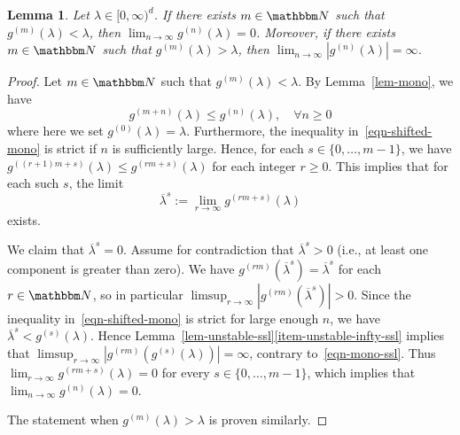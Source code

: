 \documentclass[11pt]{article}
\theoremstyle{plain}
\newtheorem{lem}[thm]{Lemma}
\theoremstyle{definition}
\numberwithin{equation}{section}
\newcommand{\eqb}{\begin{equation}}
\newcommand{\eqe}{\end{equation}}
\newcommand{\BB}{\mathbbm}
\newcommand{\ol}{\overline}
\begin{document}
\begin{lem} \label{lem-monotone-lim}
Let $\lambda \in [0,\infty)^d$.
If there exists $ m \in \BB N$ such that $g^{(m)}(\lambda) < \lambda$, then $\lim_{n\to\infty} g^{(n)}(\lambda) = 0$. 
Moreover, if there exists $m \in\BB N$ such that $g^{(m)}(\lambda) > \lambda$, then $\lim_{n\to\infty} |g^{(n)}(\lambda)| = \infty$.
\end{lem}
\begin{proof}
Let $m \in \BB N$ such that $g^{(m)}(\lambda) < \lambda$. 
By Lemma~\ref{lem-mono}, we have
\eqb  \label{eqn-shifted-mono} 
g^{(m + n)}(\lambda) \leq g^{(n)}(\lambda) ,\quad \forall n \geq 0 
\eqe 
where here we set $g^{(0)}(\lambda) = \lambda$. Furthermore, the inequality in~\eqref{eqn-shifted-mono} is strict if $n$ is sufficiently large. 
Hence, for each $s \in \{0,\dots,m-1\}$, we have $g^{((r+1) m + s)}(\lambda) \leq g^{(r m +s)}(\lambda)$ for each integer $r  \geq 0$. This implies that for each such $s$, the limit
\eqb  \label{eqn-mono-ssl}
\ol\lambda^s := \lim_{r \to \infty} g^{(r m + s)}(\lambda) 
\eqe 
exists. 

We claim that $\ol\lambda^s = 0$.  
Assume for contradiction that $\ol\lambda^s  > 0$ (i.e., at least one component is greater than zero). 
We have $g^{(r m)}(\ol\lambda^s) = \ol\lambda^s$ for each $r \in \BB N$, so in particular $\limsup_{r\to\infty} | g^{(r m  )}( \ol\lambda^s)| > 0$. Since the inequality in~\eqref{eqn-shifted-mono} is strict for large enough $n$, we have $\ol\lambda^s < g^{(s)}(\lambda)$. %
Hence Lemma~\ref{lem-unstable-ssl}\eqref{item-unstable-infty-ssl} implies that $\limsup_{r\to\infty} |g^{(r m)}( g^{(s)}(\lambda) ) | = \infty$, contrary to~\eqref{eqn-mono-ssl}. 
Thus $\lim_{r\to\infty} g^{(r m+s)}(\lambda) = 0$ for every $s \in \{0,\dots,m-1\}$, which implies that $\lim_{n\to\infty} g^{(n)}(\lambda) = 0$. 
  
The statement when $g^{(m)}(\lambda) > \lambda$ is proven similarly.  
\end{proof}
\end{document}
